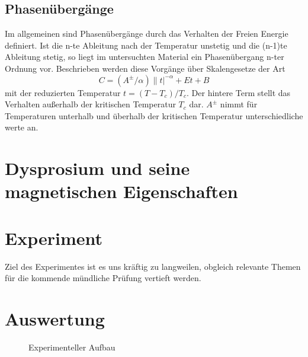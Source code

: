 \documentclass{include/thesisclass3}
\begin{document}
\section{Phasenübergänge}
Im allgemeinen sind Phasenübergänge durch das Verhalten der Freien Energie definiert. Ist die n-te Ableitung nach der Temperatur unstetig und die (n-1)te Ableitung stetig, so liegt im untersuchten Material ein Phasenübergang n-ter Ordnung vor. 
Beschrieben werden diese Vorgänge über Skalengesetze der Art
\begin{equation}
C=(A^{\pm}/\alpha)\|t|^{-\alpha}+Et+B
\end{equation}
mit der reduzierten Temperatur $t=(T-T_c)/T_c$. Der hintere Term stellt das Verhalten außerhalb der kritischen Temperatur $T_c$ dar. $A^{\pm}$ nimmt für Temperaturen unterhalb und überhalb der kritischen Temperatur unterschiedliche werte an. 
 
\chapter{Dysprosium und seine magnetischen Eigenschaften}
\chapter{Experiment}
Ziel des Experimentes ist es uns kräftig zu langweilen, obgleich relevante Themen für die kommende mündliche Prüfung vertieft werden.
\chapter{Auswertung}


\begin{figure}[ht]
	\begin{center}
		\caption{Experimenteller Aufbau}
		\label{aufbau}
	\end{center}
\end{figure}
\end{document}

